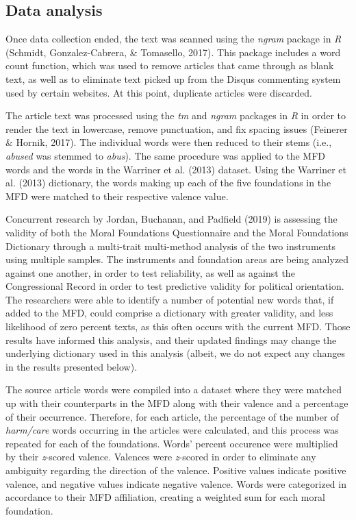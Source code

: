 \documentclass[english,,man]{apa6}
\begin{document}
\hypertarget{data-analysis}{%
\subsection{Data analysis}\label{data-analysis}}

Once data collection ended, the text was scanned using the \emph{ngram} package in \emph{R} (Schmidt, Gonzalez-Cabrera, \& Tomasello, 2017). This package includes a word count function, which was used to remove articles that came through as blank text, as well as to eliminate text picked up from the Disqus commenting system used by certain websites. At this point, duplicate articles were discarded.

The article text was processed using the \emph{tm} and \emph{ngram} packages in \emph{R} in order to render the text in lowercase, remove punctuation, and fix spacing issues (Feinerer \& Hornik, 2017). The individual words were then reduced to their stems (i.e., \emph{abused} was stemmed to \emph{abus}). The same procedure was applied to the MFD words and the words in the Warriner et al. (2013) dataset. Using the Warriner et al. (2013) dictionary, the words making up each of the five foundations in the MFD were matched to their respective valence value.

Concurrent research by Jordan, Buchanan, and Padfield (2019) is assessing the validity of both the Moral Foundations Questionnaire and the Moral Foundations Dictionary through a multi-trait multi-method analysis of the two instruments using multiple samples. The instruments and foundation areas are being analyzed against one another, in order to test reliability, as well as against the Congressional Record in order to test predictive validity for political orientation. The researchers were able to identify a number of potential new words that, if added to the MFD, could comprise a dictionary with greater validity, and less likelihood of zero percent texts, as this often occurs with the current MFD. Those results have informed this analysis, and their updated findings may change the underlying dictionary used in this analysis (albeit, we do not expect any changes in the results presented below).

The source article words were compiled into a dataset where they were matched up with their counterparts in the MFD along with their valence and a percentage of their occurrence. Therefore, for each article, the percentage of the number of \emph{harm/care} words occurring in the articles were calculated, and this process was repeated for each of the foundations. Words' percent occurence were multiplied by their \emph{z}-scored valence. Valences were \emph{z}-scored in order to eliminate any ambiguity regarding the direction of the valence. Positive values indicate positive valence, and negative values indicate negative valence. Words were categorized in accordance to their MFD affiliation, creating a weighted sum for each moral foundation.
\end{document}

